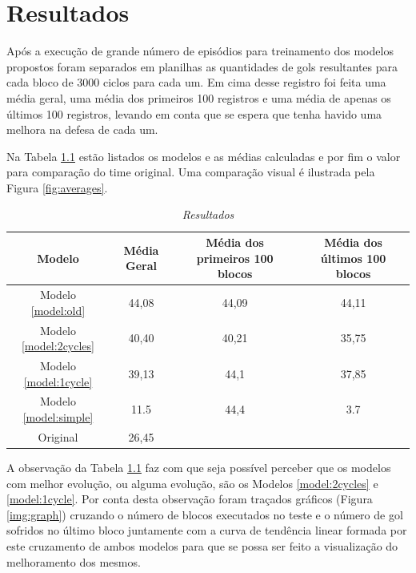 \chapter{Resultados} \label{sec:results}

Após a execução de grande número de episódios para treinamento dos modelos
propostos foram separados em planilhas as quantidades de gols resultantes para
cada bloco de 3000 ciclos para cada um. Em cima desse registro foi feita uma
média geral, uma média dos primeiros 100 registros e uma média de apenas os
últimos 100 registros, levando em conta que se
espera que tenha havido uma melhora na defesa de cada um.

Na Tabela \ref{tab:results} estão listados os modelos e as médias calculadas e
por fim o valor para comparação do time original. Uma comparação visual é
ilustrada pela Figura \ref{fig:averages}.

\begin{table}[hbt]
    \centering
    \begin{tabular}{c|c|c|c}
        Modelo & Média Geral & Média dos primeiros 100 blocos & Média dos últimos 100 blocos \\ \hline
        Modelo \ref{model:old} & 44,08 & 44,09 & 44,11  \\
        Modelo \ref{model:2cycles} & 40,40 & 40,21 & 35,75 \\
        Modelo \ref{model:1cycle} & 39,13 & 44,1 & 37,85 \\
        Modelo \ref{model:simple} & 11.5 & 44,4 & 3.7 \\ \hline
        Original &  26,45\\
    \end{tabular}
    \caption{\textit{Resultados}}
    \label{tab:results}
\end{table}


A observação da Tabela \ref{tab:results} faz com que seja possível perceber que
os modelos com melhor evolução, ou alguma evolução, são os Modelos
\ref{model:2cycles} e \ref{model:1cycle}. Por conta desta observação foram
traçados gráficos (Figura \ref{img:graph}) cruzando o número de blocos executados no teste e o número de
gol sofridos no último bloco juntamente com a curva de tendência linear formada
por este cruzamento de ambos modelos para que se possa ser feito a visualização
do melhoramento dos mesmos.

